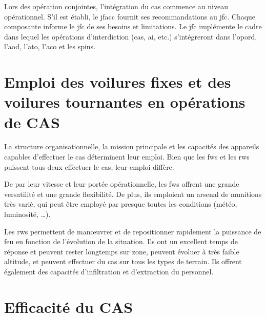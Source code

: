 \begin{e1}
	\item Lors des opération conjointes, l'intégration du \gls{cas} commence au niveau opérationnel. S'il est établi, le \gls{jfacc} fournit ses recommandations au \gls{jfc}. Chaque composante informe le \gls{jfc} de ses besoins et limitations. Le \gls{jfc} implémente le cadre dans lequel les opérations d'interdiction (\gls{cas}, \gls{ai}, etc.) s'intégreront dans l'\gls{opord}, l'\gls{aod}, l'\gls{ato}, l'\gls{aco} et les \gls{spins}.
\end{e1}

\section{Emploi des voilures fixes et des voilures tournantes en opérations de CAS}

\begin{e1}
	\item
	La structure organisationnelle, la mission principale et les capacités des appareils capables d'effectuer le \gls{cas} déterminent leur emploi. Bien que les \glspl{fw} et les \glspl{rw} puissent tous deux effectuer le \gls{cas}, leur emploi diffère.
	
	\item
	De par leur vitesse et leur portée opérationnelle, les \glspl{fw} offrent une grande versatilité et une grande flexibilité. De plus, ils emploient un arsenal de munitions très varié, qui peut être employé par presque toutes les conditions (météo, luminosité, \ldots{}).
	
	\item
	Les \glspl{rw} permettent de manœuvrer et de repositionner rapidement la puissance de feu en fonction de l'évolution de la situation. Ils ont un excellent temps de réponse et peuvent rester longtemps sur zone, peuvent évoluer à très faible altitude, et peuvent effectuer du \gls{cas} sur tous les types de terrain. Ils offrent également des capacités d'infiltration et d'extraction du personnel.

\end{e1}

\section{Efficacité du CAS}

